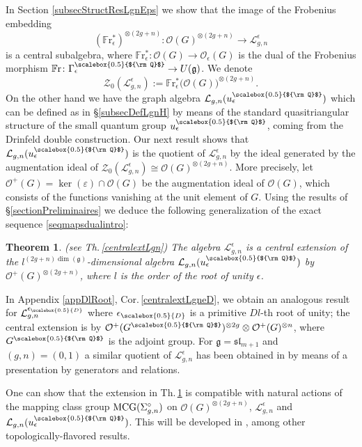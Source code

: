 \documentclass[11pt]{amsart}
\newtheorem{teo}{Theorem}[section]
\newcommand{\e}{\epsilon}
\newcommand{\Ll}{\mathcal{L}}
\newcommand{\Oo}{\mathcal{O}}
\newcommand{\eD}{\epsilon_{\scalebox{0.5}{D}}}
\newcommand{\Q}{{\scalebox{0.5}{${\rm Q}$}}}
\begin{document}
In Section \ref{subsecStructResLgnEps} we show that the image of the Frobenius embedding
\begin{equation}\label{Frobembintro}(\mathbb{F}\mathrm{r}^*_\e)^{\otimes (2g+n)} \colon \Oo(G)^{\otimes (2g+n)}\to \Ll_{g,n}^\e
\end{equation}
is a central subalgebra, where $\mathbb{F}\mathrm{r}^*_\e : \mathcal{O}(G) \to \Oo_\e(G)$ is the dual of the Frobenius morphism $\mathbb{F}\mathrm{r}\colon \Gamma_\e^\Q \to U(\mathfrak{g})$. We denote $$\mathcal{Z}_0(\mathcal{L}_{g,n}^\e) := \mathbb{F}\mathrm{r}^*_\e\bigl( \Oo(G) \bigr)^{\otimes (2g+n)}.$$ On the other hand we have the graph algebra $\Ll_{g,n}(u_\e^\Q)$ which can be defined as in \S \ref{subsecDefLgnH} by means of the standard quasitriangular structure of the small quantum group $u_\e^\Q$, coming from the Drinfeld double construction. Our next result shows that $\Ll_{g,n}(u_\e^\Q)$ is the quotient of $\Ll_{g,n}^{\e}$ by the ideal generated by the augmentation ideal of $\mathcal{Z}_0(\mathcal{L}_{g,n}^\e) \cong \mathcal{O}(G)^{\otimes (2g+n)}$. More precisely, let $\Oo^+(G) = \ker(\varepsilon) \cap \Oo(G)$ be the augmentation ideal of $\mathcal{O}(G)$, which consists of the functions vanishing at the unit element of $G$. Using the results of \S \ref{sectionPreliminaires} we  deduce the following generalization of the exact sequence \eqref{seqmapsdualintro}:

\begin{teo}\label{LgnLgnpetit} {\rm (see Th.\,\ref{centralextLgn})} The algebra $\Ll_{g,n}^{\e}$ is a central extension of the $l^{(2g+n)\dim(\mathfrak{g})}$-dimensional algebra $\mathcal{L}_{g,n}(u_\epsilon^\Q)$ by $\Oo^+(G)^{\otimes (2g+n)}$, where $l$ is the order of the root of unity $\e$.
\end{teo}

In Appendix \ref{appDlRoot}, Cor.\,\ref{centralextLgneD}, we obtain an analogous result for $\Ll_{g,n}^{\eD}$ where $\eD$ is a primitive $Dl$-th root of unity; the central extension is by $\Oo^+(G^\Q)^{\otimes 2g}\otimes \Oo^+(G)^{\otimes n}$, where $G^\Q$ is the adjoint group. For $\mathfrak{g}=\mathfrak{sl}_{m+1}$ and $(g,n)=(0,1)$ a similar quotient of $\Ll_{g,n}^{\e}$ has been obtained in \cite{CooLau} by means of a presentation by generators and relations.

One can show that the extension in Th.\,\ref{LgnLgnpetit} is compatible with natural actions \cite{AS,FaitgMCG} of the mapping class group ${\rm MCG}(\Sigma_{g,n}^\circ)$ on $\mathcal{O}(G)^{\otimes (2g+n)}$, $\Ll_{g,n}^{\e}$ and $\Ll_{g,n}(u_\e^\Q)$. This will be developed in \cite{BF}, among other topologically-flavored results. 
\end{document}
